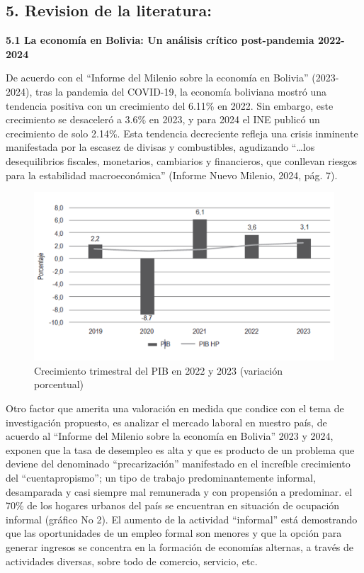 \documentclass[Royal,times,sageh]{sagej}
\begin{document}
\subsection{\texorpdfstring{5. \textbf{Revision de la
literatura:}}{5. Revision de la literatura:}}\label{revision-de-la-literatura}

\textbf{5.1 La economía en Bolivia: Un análisis crítico post-pandemia
2022-2024}

De acuerdo con el ``Informe del Milenio sobre la economía en Bolivia''
(2023-2024), tras la pandemia del COVID-19, la economía boliviana mostró
una tendencia positiva con un crecimiento del 6.11\% en 2022. Sin
embargo, este crecimiento se desaceleró a 3.6\% en 2023, y para 2024 el
INE publicó un crecimiento de solo 2.14\%. Esta tendencia decreciente
refleja una crisis inminente manifestada por la escasez de divisas y
combustibles, agudizando ``\ldots los desequilibrios fiscales,
monetarios, cambiarios y financieros, que conllevan riesgos para la
estabilidad macroeconómica'' (Informe Nuevo Milenio, 2024, pág. 7).

\begin{figure}

{\centering \includegraphics[width=1\linewidth]{Imagen 1} 

}

\caption{Crecimiento trimestral del PIB en 2022 y 2023 (variación porcentual)}\label{fig:i1}
\end{figure}

Otro factor que amerita una valoración en medida que condice con el tema
de investigación propuesto, es analizar el mercado laboral en nuestro
país, de acuerdo al ``Informe del Milenio sobre la economía en Bolivia''
2023 y 2024, exponen que la tasa de desempleo es alta y que es producto
de un problema que deviene del denominado ``precarización'' manifestado
en el increíble crecimiento del ``cuentapropismo''; un tipo de trabajo
predominantemente informal, desamparada y casi siempre mal remunerada y
con propensión a predominar. el 70\% de los hogares urbanos del país se
encuentran en situación de ocupación informal (gráfico No 2). El aumento
de la actividad ``informal'' está demostrando que las oportunidades de
un empleo formal son menores y que la opción para generar ingresos se
concentra en la formación de economías alternas, a través de actividades
diversas, sobre todo de comercio, servicio, etc.
\end{document}
